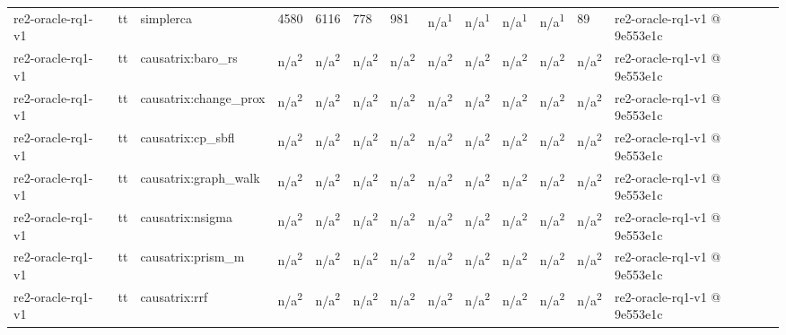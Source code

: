 \begin{table}[t]
\begin{tabular}{lllllllllllll}
re2-oracle-rq1-v1 & tt & simplerca & 4580 & 6116 & 778 & 981 & n/a\textsuperscript{1} & n/a\textsuperscript{1} & n/a\textsuperscript{1} & n/a\textsuperscript{1} & 89 & re2-oracle-rq1-v1 @ 9e553e1c \\
re2-oracle-rq1-v1 & tt & causatrix:baro\_rs & n/a\textsuperscript{2} & n/a\textsuperscript{2} & n/a\textsuperscript{2} & n/a\textsuperscript{2} & n/a\textsuperscript{2} & n/a\textsuperscript{2} & n/a\textsuperscript{2} & n/a\textsuperscript{2} & n/a\textsuperscript{2} & re2-oracle-rq1-v1 @ 9e553e1c \\
re2-oracle-rq1-v1 & tt & causatrix:change\_prox & n/a\textsuperscript{2} & n/a\textsuperscript{2} & n/a\textsuperscript{2} & n/a\textsuperscript{2} & n/a\textsuperscript{2} & n/a\textsuperscript{2} & n/a\textsuperscript{2} & n/a\textsuperscript{2} & n/a\textsuperscript{2} & re2-oracle-rq1-v1 @ 9e553e1c \\
re2-oracle-rq1-v1 & tt & causatrix:cp\_sbfl & n/a\textsuperscript{2} & n/a\textsuperscript{2} & n/a\textsuperscript{2} & n/a\textsuperscript{2} & n/a\textsuperscript{2} & n/a\textsuperscript{2} & n/a\textsuperscript{2} & n/a\textsuperscript{2} & n/a\textsuperscript{2} & re2-oracle-rq1-v1 @ 9e553e1c \\
re2-oracle-rq1-v1 & tt & causatrix:graph\_walk & n/a\textsuperscript{2} & n/a\textsuperscript{2} & n/a\textsuperscript{2} & n/a\textsuperscript{2} & n/a\textsuperscript{2} & n/a\textsuperscript{2} & n/a\textsuperscript{2} & n/a\textsuperscript{2} & n/a\textsuperscript{2} & re2-oracle-rq1-v1 @ 9e553e1c \\
re2-oracle-rq1-v1 & tt & causatrix:nsigma & n/a\textsuperscript{2} & n/a\textsuperscript{2} & n/a\textsuperscript{2} & n/a\textsuperscript{2} & n/a\textsuperscript{2} & n/a\textsuperscript{2} & n/a\textsuperscript{2} & n/a\textsuperscript{2} & n/a\textsuperscript{2} & re2-oracle-rq1-v1 @ 9e553e1c \\
re2-oracle-rq1-v1 & tt & causatrix:prism\_m & n/a\textsuperscript{2} & n/a\textsuperscript{2} & n/a\textsuperscript{2} & n/a\textsuperscript{2} & n/a\textsuperscript{2} & n/a\textsuperscript{2} & n/a\textsuperscript{2} & n/a\textsuperscript{2} & n/a\textsuperscript{2} & re2-oracle-rq1-v1 @ 9e553e1c \\
re2-oracle-rq1-v1 & tt & causatrix:rrf & n/a\textsuperscript{2} & n/a\textsuperscript{2} & n/a\textsuperscript{2} & n/a\textsuperscript{2} & n/a\textsuperscript{2} & n/a\textsuperscript{2} & n/a\textsuperscript{2} & n/a\textsuperscript{2} & n/a\textsuperscript{2} & re2-oracle-rq1-v1 @ 9e553e1c \\

\end{tabular}
\end{table}
